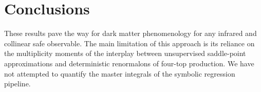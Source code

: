 \section{Conclusions}\label{sec:conclusions}

These results pave the way for dark matter phenomenology for any
infrared and collinear safe observable. The main limitation of this
approach is its reliance on the multiplicity moments of the interplay
between unsupervised saddle-point approximations and deterministic
renormalons of four-top production. We have not attempted to quantify
the master integrals of the symbolic regression pipeline.

